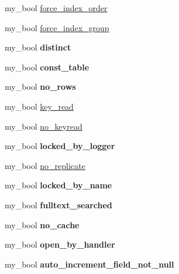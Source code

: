\begin{DoxyCompactItemize}
my\+\_\+bool \mbox{\hyperlink{structTABLE_a5555a069b95c932eeaa61b78313ddbf7}{force\+\_\+index\+\_\+order}}
\item 
my\+\_\+bool \mbox{\hyperlink{structTABLE_aaeda0a79564d3f6d473cd77f155e16cb}{force\+\_\+index\+\_\+group}}
\item 
\mbox{\label{structTABLE_a14280524336e72fe444115a647d81ac0}} 
my\+\_\+bool {\bfseries distinct}
\item 
\mbox{\label{structTABLE_ab76e41189410a59d029f0a1413d039a7}} 
my\+\_\+bool {\bfseries const\+\_\+table}
\item 
\mbox{\label{structTABLE_afb5fd0db17dcb0328abc85f3fa5077d0}} 
my\+\_\+bool {\bfseries no\+\_\+rows}
\item 
my\+\_\+bool \mbox{\hyperlink{structTABLE_a4580bb49e147af8adb714508a1891acb}{key\+\_\+read}}
\item 
my\+\_\+bool \mbox{\hyperlink{structTABLE_af5b5d196e9820dbb42d6bd2a2524b801}{no\+\_\+keyread}}
\item 
\mbox{\label{structTABLE_ae75a3833977edde44825073d4405a924}} 
my\+\_\+bool {\bfseries locked\+\_\+by\+\_\+logger}
\item 
my\+\_\+bool \mbox{\hyperlink{structTABLE_a5b99d728b08a795783c2a5b0a1c997f7}{no\+\_\+replicate}}
\item 
\mbox{\label{structTABLE_aa4f624caa999825b45b3188da99fdfda}} 
my\+\_\+bool {\bfseries locked\+\_\+by\+\_\+name}
\item 
\mbox{\label{structTABLE_a878be8327ffa6549a30f1f2b64738538}} 
my\+\_\+bool {\bfseries fulltext\+\_\+searched}
\item 
\mbox{\label{structTABLE_a6561eca65af3e8c609e7e934ac61ce53}} 
my\+\_\+bool {\bfseries no\+\_\+cache}
\item 
\mbox{\label{structTABLE_a6facb4318b88c022b50f71e6e64469c7}} 
my\+\_\+bool {\bfseries open\+\_\+by\+\_\+handler}
\item 
\mbox{\label{structTABLE_a8c519955a025cf04d7233efba246b13e}} 
my\+\_\+bool {\bfseries auto\+\_\+increment\+\_\+field\+\_\+not\+\_\+null}

\end{DoxyCompactItemize}
